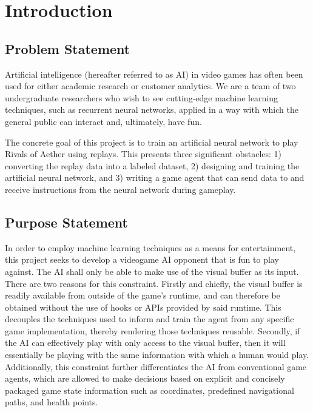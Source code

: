 \chapter{Introduction}


\section{Problem Statement}

Artificial intelligence (hereafter referred to as AI) in video games has often been used for either academic research or customer analytics. We are a team of two undergraduate researchers who wish to see cutting-edge machine learning techniques, such as recurrent neural networks, applied in a way with which the general public can interact and, ultimately, have fun.

The concrete goal of this project is to train an artificial neural network to play Rivals of Aether using replays. This presents three significant obstacles: 1) converting the replay data into a labeled dataset, 2) designing and training the artificial neural network, and 3) writing a game agent that can send data to and receive instructions from the neural network during gameplay.




\section{Purpose Statement}

 In order to employ machine learning techniques as a means for entertainment, this project seeks to develop a videogame AI opponent that is fun to play against. The AI shall only be able to make use of the visual buffer as its input. There are two reasons for this constraint. Firstly and chiefly, the visual buffer is readily available from outside of the game's runtime, and can therefore be obtained without the use of hooks or APIs provided by said runtime. This decouples the techniques used to inform and train the agent from any specific game implementation, thereby rendering those techniques reusable. Secondly, if the AI can effectively play with only access to the visual buffer, then it will essentially be playing with the same information with which a human would play. Additionally, this constraint further differentiates the AI from conventional game agents, which are allowed to make decisions based on explicit and concisely packaged game state information such as coordinates, predefined navigational paths, and health points.
 
